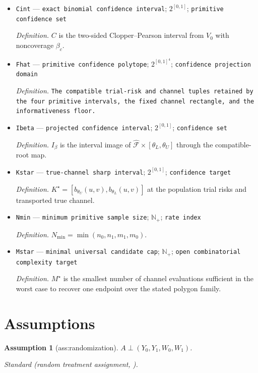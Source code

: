 \documentclass{article}
\newtheorem{assumption}{Assumption}
\begin{document}
\begin{itemize}
  \item \texttt{Cint} --- \texttt{exact binomial confidence interval}; \(2^{[0,1]}\); \texttt{primitive confidence set}
  \par\smallskip\noindent\emph{Definition.} \(C\) is the two-sided Clopper--Pearson interval from \(V_0\) with noncoverage \(\beta_c\).
  \item \texttt{Fhat} --- \texttt{primitive confidence polytope}; \(2^{[0,1]^4}\); \texttt{confidence projection domain}
  \par\smallskip\noindent\emph{Definition.} \texttt{The compatible trial-\allowbreak{}risk and channel tuples retained by the four primitive intervals,\allowbreak{} the fixed channel rectangle,\allowbreak{} and the informativeness floor.}
  \item \texttt{Ibeta} --- \texttt{projected confidence interval}; \(2^{[0,1]}\); \texttt{confidence set}
  \par\smallskip\noindent\emph{Definition.} \(I_{\beta}\) is the interval image of \(\widehat{\mathcal F}\times[\theta_L,\theta_U]\) through the compatible-root map.
  \item \texttt{Kstar} --- \texttt{true-\allowbreak{}channel sharp interval}; \(2^{[0,1]}\); \texttt{confidence target}
  \par\smallskip\noindent\emph{Definition.} \(K^{\star}=[b_{\theta_U}(u,v),b_{\theta_L}(u,v)]\) at the population trial risks and transported true channel.
  \item \texttt{Nmin} --- \texttt{minimum primitive sample size}; \(\mathbb N_{+}\); \texttt{rate index}
  \par\smallskip\noindent\emph{Definition.} \(N_{\min}=\min(n_0,n_1,m_1,m_0)\).
  \item \texttt{Mstar} --- \texttt{minimal universal candidate cap}; \(\mathbb N_{+}\); \texttt{open combinatorial complexity target}
  \par\smallskip\noindent\emph{Definition.} \(M^{\star}\) is the smallest number of channel evaluations sufficient in the worst case to recover one endpoint over the stated polygon family.
\end{itemize}

\section{Assumptions}

\begin{assumption}[ass:randomization]\label{ass:randomization}
\(A\perp (Y_0,Y_1,W_0,W_1)\).
\par\smallskip\noindent\emph{Standard} (random treatment assignment, \cite{Rubin1974}).
\end{assumption}
\end{document}

